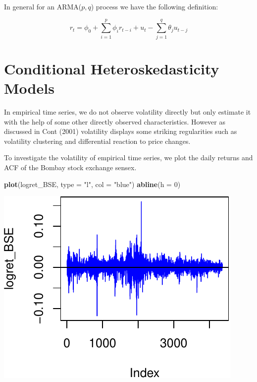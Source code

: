 \documentclass[11pt,]{article}
\newenvironment{Shaded}{\begin{snugshade}}{\end{snugshade}}
\newcommand{\KeywordTok}[1]{\textcolor[rgb]{0.13,0.29,0.53}{\textbf{#1}}}
\newcommand{\DataTypeTok}[1]{\textcolor[rgb]{0.13,0.29,0.53}{#1}}
\newcommand{\DecValTok}[1]{\textcolor[rgb]{0.00,0.00,0.81}{#1}}
\newcommand{\StringTok}[1]{\textcolor[rgb]{0.31,0.60,0.02}{#1}}
\newcommand{\NormalTok}[1]{#1}
\begin{document}
In general for an ARMA(\(p, q\)) process we have the following
definition:

\[r_t = \phi_0 + \sum_{i=1}^p \phi_ir_{t-i}+u_t-\sum_{j=1}^q \theta_ju_{t-j}\]

\section{Conditional Heteroskedasticity
Models}\label{conditional-heteroskedasticity-models}

In empirical time series, we do not observe volatility directly but only
estimate it with the help of some other directly observed
characteristics. However as discussed in Cont (2001) volatility displays
some striking regularities such as volatility clustering and
differential reaction to price changes.

To investigate the volatility of empirical time series, we plot the
daily returns and ACF of the Bombay stock exchange sensex.

\begin{Shaded}
\begin{Highlighting}[]
\KeywordTok{plot}\NormalTok{(logret_BSE, }\DataTypeTok{type =} \StringTok{"l"}\NormalTok{, }\DataTypeTok{col =} \StringTok{"blue"}\NormalTok{)}
\KeywordTok{abline}\NormalTok{(}\DataTypeTok{h =} \DecValTok{0}\NormalTok{)}
\end{Highlighting}
\end{Shaded}

\begin{center}\includegraphics{FMC_T4_PhD_ARMA_GARCH_files/figure-latex/BSE_ret_ACF-1} \end{center}
\end{document}
